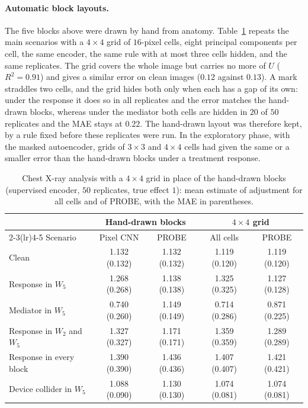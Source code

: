 \paragraph{Automatic block layouts.} The five blocks above were drawn by hand from anatomy. Table~\ref{tab:single-image-layouts} repeats the main scenarios with a $4\times4$ grid of $16$-pixel cells, eight principal components per cell, the same encoder, the same rule with at most three cells hidden, and the same replicates. The grid covers the whole image but carries no more of $U$ ($R^2=0.91$) and gives a similar error on clean images ($0.12$ against $0.13$). A mark straddles two cells, and the grid hides both only when each has a gap of its own: under the response it does so in all replicates and the error matches the hand-drawn blocks, whereas under the mediator both cells are hidden in $20$ of $50$ replicates and the MAE stays at $0.22$. The hand-drawn layout was therefore kept, by a rule fixed before these replicates were run. In the exploratory phase, with the masked autoencoder, grids of $3\times3$ and $4\times4$ cells had given the same or a smaller error than the hand-drawn blocks under a treatment response.

\begin{table}[t]
\caption{Chest X-ray analysis with a $4\times4$ grid in place of the hand-drawn blocks (supervised encoder, $50$ replicates, true effect $1$): mean estimate of adjustment for all cells and of PROBE, with the MAE in parentheses.}
\label{tab:single-image-layouts}
\centering
\footnotesize
\begin{tabular}{lcccc}
\toprule
 & \multicolumn{2}{c}{Hand-drawn blocks} & \multicolumn{2}{c}{$4\times4$ grid} \\
\cmidrule(lr){2-3}\cmidrule(lr){4-5}
Scenario & Pixel CNN & PROBE & All cells & PROBE \\
\midrule
Clean & 1.132 (0.132) & 1.132 (0.132) & 1.119 (0.120) & 1.119 (0.120) \\
Response in $W_5$ & 1.268 (0.268) & 1.138 (0.138) & 1.325 (0.325) & 1.127 (0.128) \\
Mediator in $W_5$ & 0.740 (0.260) & 1.149 (0.149) & 0.714 (0.286) & 0.871 (0.225) \\
Response in $W_2$ and $W_5$ & 1.327 (0.327) & 1.171 (0.171) & 1.359 (0.359) & 1.289 (0.289) \\
Response in every block & 1.390 (0.390) & 1.436 (0.436) & 1.407 (0.407) & 1.421 (0.421) \\
Device collider in $W_5$ & 1.088 (0.090) & 1.130 (0.130) & 1.074 (0.081) & 1.074 (0.081) \\
\bottomrule
\end{tabular}
\end{table}

